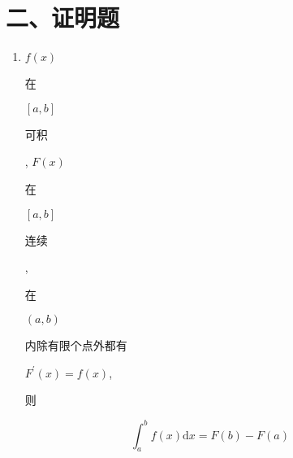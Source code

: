 \documentclass[10pt]{article}
\begin{document}
\section{二、证明题}
\begin{enumerate}
  \item $f(x)$ \begin{CJK}{UTF8}{mj}在\end{CJK} $[a, b]$ \begin{CJK}{UTF8}{mj}可积\end{CJK}, $F(x)$ \begin{CJK}{UTF8}{mj}在\end{CJK} $[a, b]$ \begin{CJK}{UTF8}{mj}连续\end{CJK}, \begin{CJK}{UTF8}{mj}在\end{CJK} $(a, b)$ \begin{CJK}{UTF8}{mj}内除有限个点外都有\end{CJK} $F^{\prime}(x)=f(x)$, \begin{CJK}{UTF8}{mj}则\end{CJK}
\end{enumerate}
$$
\int_{a}^{b} f(x) \mathrm{d} x=F(b)-F(a)
$$
\end{document}
